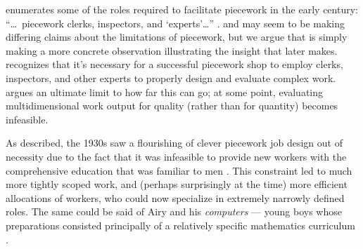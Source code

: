 \documentclass[trackingWork]{subfiles}
\begin{document}
\citeauthor{10.2307/23702539} enumerates some of the roles required
to facilitate piecework in the early  century:
    ``\dots~piecework clerks, inspectors, and `experts'\dots''
\cite{hart2016rise,10.2307/23702539}.
\citeauthor{10.2307/23702539} and \citeauthor{hart2016rise} may seem
to be making differing claims about the limitations of piecework, but
we argue that \citeauthor{10.2307/23702539}
is simply making a more concrete observation illustrating the insight that
\citeauthor{hart2016rise} later makes. 
\citeauthor{10.2307/23702539} recognizes that
it's necessary for a successful piecework shop to employ
clerks,
inspectors, and
other experts to properly design and evaluate complex work.
\citeauthor{hart2016rise} argues an ultimate limit to how far this can go;
at some point, evaluating multidimensional work output for quality
(rather than for quantity) becomes infeasible.

As \citeauthor{hart2013rise} described,
the 1930s saw a flourishing of clever piecework job design out of necessity
due to the fact that it was infeasible to provide new workers with
the comprehensive education that was familiar to men
\cite{hart2013rise}.
This constraint led to much more tightly scoped work, and
(perhaps surprisingly at the time) more efficient allocations of workers,
who could now specialize in extremely narrowly defined roles.
The same could be said of Airy and his \textit{computers}
--- young boys whose preparations consisted principally of
a relatively specific mathematics curriculum
\cite{grier2013computers}. 
\end{document}
